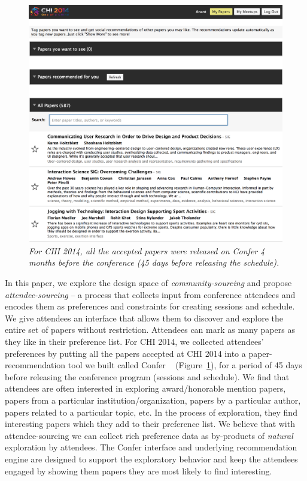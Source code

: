 \documentclass[letterpaper]{article}
\begin{document}
\begin{figure}[!h]
\centering
\includegraphics[width=0.9\columnwidth]{all-accepted-papers.png}
\caption{\emph{For CHI 2014, all the accepted papers were released on Confer 4 months before the conference (45 days before releasing the schedule).}}
\label{all-accepted-papers}
\end{figure}
\noindent
In this paper, we explore the design space of \emph{community-sourcing} and propose \emph{attendee-sourcing} -- a process that collects input from conference attendees and encodes them as preferences and constraints for creating sessions and schedule. We give attendees an interface that allows them to discover and explore the entire set of papers without restriction. Attendees can mark as many papers as they like in their preference list. For CHI 2014, we collected attendees' preferences by putting all the papers accepted at CHI 2014 into a paper-recommendation tool we built called Confer ~\cite{Confer} (Figure~\ref{all-accepted-papers}), for a period of 45 days before releasing the conference program (sessions and schedule). We find that attendees are often interested in exploring award/honorable mention papers, papers from a particular institution/organization, papers by a particular author, papers related to a particular topic, etc. In the process of exploration, they find interesting papers which they add to their preference list. We believe that with attendee-sourcing we can collect rich preference data as by-products of \emph{natural} exploration by attendees. The Confer interface and underlying recommendation engine are designed to support the exploratory behavior and keep the attendees engaged by showing them papers they are most likely to find interesting.
\end{document}
